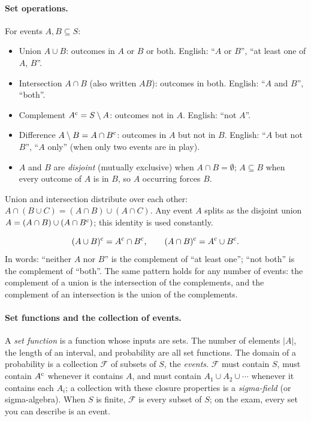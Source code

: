 \paragraph{Set operations.}
For events $A, B \subseteq S$:
\begin{itemize}[nosep]
  \item Union $A \cup B$: outcomes in $A$ or $B$ or both. English: ``$A$ or $B$'',
        ``at least one of $A$, $B$''.
  \item Intersection $A \cap B$ (also written $AB$): outcomes in both. English:
        ``$A$ and $B$'', ``both''.
  \item Complement $A^{\mathrm{c}} = S \setminus A$: outcomes not in $A$. English: ``not $A$''.
  \item Difference $A \setminus B = A \cap B^{\mathrm{c}}$: outcomes in $A$ but not in $B$.
        English: ``$A$ but not $B$'', ``$A$ only'' (when only two events are in play).
  \item $A$ and $B$ are \emph{disjoint} (mutually exclusive) when $A \cap B = \emptyset$;
        $A \subseteq B$ when every outcome of $A$ is in $B$, so $A$ occurring forces $B$.
\end{itemize}
Union and intersection distribute over each other:
$A \cap (B \cup C) = (A\cap B) \cup (A \cap C)$. Any event $A$ splits as the
disjoint union $A = (A \cap B) \cup (A \cap B^{\mathrm{c}})$; this identity is used constantly.

\begin{keyfact}
\[
  (A \cup B)^{\mathrm{c}} = A^{\mathrm{c}} \cap B^{\mathrm{c}},
  \qquad
  (A \cap B)^{\mathrm{c}} = A^{\mathrm{c}} \cup B^{\mathrm{c}}.
\]
In words: ``neither $A$ nor $B$'' is the complement of ``at least one'';
``not both'' is the complement of ``both''. The same pattern holds for any number
of events: the complement of a union is the intersection of the complements, and
the complement of an intersection is the union of the complements.
\end{keyfact}

\paragraph{Set functions and the collection of events.}
A \emph{set function} is a function whose inputs are sets. The number of elements
$|A|$, the length of an interval, and probability are all set functions.
The domain of a probability is a collection $\mathcal{F}$ of subsets of $S$, the
\emph{events}. $\mathcal{F}$ must contain $S$, must contain $A^{\mathrm{c}}$ whenever it
contains $A$, and must contain $A_1 \cup A_2 \cup \cdots$ whenever it contains
each $A_i$; a collection with these closure properties is a \emph{sigma-field}
(or sigma-algebra). When $S$ is finite, $\mathcal{F}$ is every subset of $S$; on the exam, every set
you can describe is an event.

